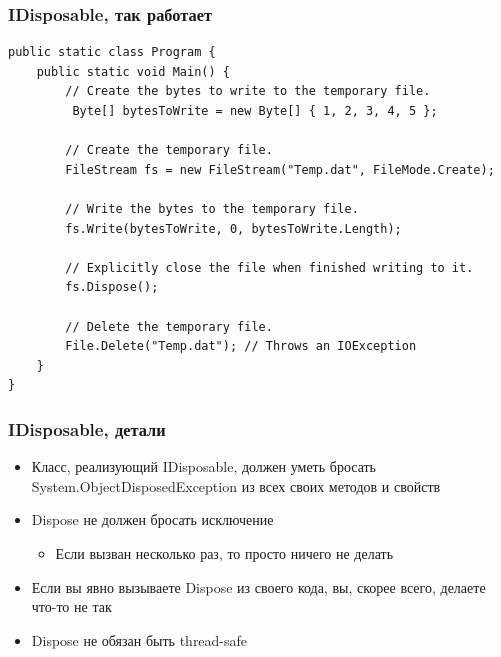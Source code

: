 \documentclass[xetex,mathserif,serif]{beamer}
\begin{document}
    \begin{frame}[fragile]
        \frametitle{IDisposable, так работает}
        \begin{scriptsize}
            \begin{verbatim}
public static class Program {
    public static void Main() {
        // Create the bytes to write to the temporary file.
         Byte[] bytesToWrite = new Byte[] { 1, 2, 3, 4, 5 };

        // Create the temporary file.
        FileStream fs = new FileStream("Temp.dat", FileMode.Create);

        // Write the bytes to the temporary file.
        fs.Write(bytesToWrite, 0, bytesToWrite.Length);

        // Explicitly close the file when finished writing to it.
        fs.Dispose();

        // Delete the temporary file.
        File.Delete("Temp.dat"); // Throws an IOException
    }
}
            \end{verbatim}
        \end{scriptsize}
    \end{frame}

    \begin{frame}
        \frametitle{IDisposable, детали}
        \begin{itemize}
            \item Класс, реализующий IDisposable, должен уметь бросать System.ObjectDisposedException из всех своих методов и свойств
            \item Dispose не должен бросать исключение
            \begin{itemize}
                \item Если вызван несколько раз, то просто ничего не делать
            \end{itemize}
            \item Если вы явно вызываете Dispose из своего кода, вы, скорее всего, делаете что-то не так
            \item Dispose не обязан быть thread-safe
        \end{itemize}
    \end{frame}
\end{document}
